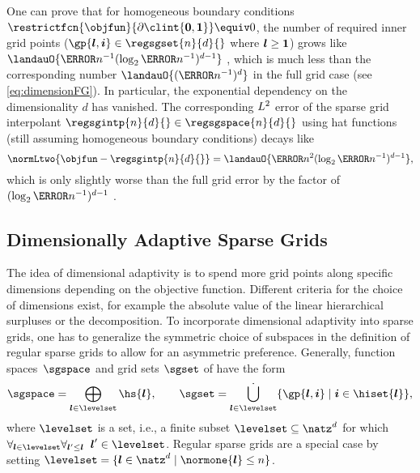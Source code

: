 One can prove that for homogeneous boundary conditions
$\restrictfcn{\objfun}{\bndrydomain{\clint{\*0,\*1}}} \equiv 0$,
the number of required inner grid points
($\gp{\*l,\*i} \in \regsgset{n}{d}{}$ where ${\boldsymbol{l}} \ge {\boldsymbol{1}}$)
grows like $\landauO{\ms{n}^{-1} (\log_2 \ms{n}^{-1})^{d-1}}$
\cite{Bungartz04Sparse}, which is much less than
the corresponding number $\landauO{(\ms{n}^{-1})^d}$ in the full grid case
(see \eqref{eq:dimensionFG}).
In particular, the exponential dependency on the dimensionality $d$
has vanished.
The corresponding $L^2$ error of the sparse grid interpolant
$\regsgintp{n}{d}{} \in \regsgspace{n}{d}{}$ using hat functions
(still assuming homogeneous boundary conditions) decays like
\begin{equation}
  \normLtwo{\objfun - \regsgintp{n}{d}{}}
  = \landauO{\ms{n}^2 (\log_2 \ms{n}^{-1})^{d-1}},
\end{equation}
which is only slightly worse than the full grid error by the factor of
$(\log_2 \ms{n}^{-1})^{d-1}$ \cite{Bungartz04Sparse}.



\subsection{Dimensionally Adaptive Sparse Grids}
\label{sec:232dimensionallyAdaptiveSG}

The idea of dimensional adaptivity is to spend more grid
points along specific dimensions depending on the objective function.
Different criteria for the choice of dimensions exist,
for example the absolute value of the linear hierarchical surpluses
or the \anova decomposition.
To incorporate dimensional adaptivity into sparse grids,
one has to generalize the symmetric
choice of subspaces in the definition of regular sparse grids
to allow for an asymmetric preference.
Generally, function spaces~$\sgspace$ and grid sets $\sgset$
of  have the form
\begin{equation}
  \sgspace
  = \bigoplus_{\*l \in \levelset} \hs{\*l},\qquad
  \sgset
  = \bigdotcup_{\*l \in \levelset} \{\gp{\*l,\*i} \mid \*i \in \hiset{\*l}\},
\end{equation}
where $\levelset$ is a  set, i.e.,
a finite subset $\levelset \subset \natz^d$
for which $\forall_{\*l \in \levelset} \fa{\*l' \le \*l}{\*l' \in \levelset}$.
Regular sparse grids are a special case by setting
$\levelset = \{\*l \in \natz^d \mid \normone{\*l} \le n\}$.

